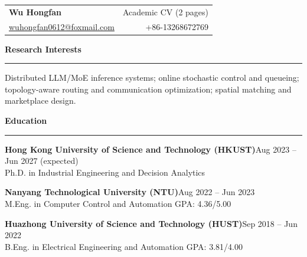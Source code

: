 \documentclass[11pt,a4paper]{article}
\newcommand{\cvsection}[1]{\vspace{2pt}\noindent\textbf{\large #1}\\[-2pt]\textcolor{cvgray}{\rule{\linewidth}{0.4pt}}\vspace{2pt}}
\newcommand{\cvname}[1]{{\huge\textbf{#1}}}
\newcommand{\cvsmall}{\fontsize{10.5pt}{13pt}\selectfont}
\newcommand{\cvitem}[2]{\textbf{#1}\hfill \textcolor{cvgray}{#2}\\}
\begin{document}
\cvsmall

\begin{tabularx}{\linewidth}{@{}X r@{}}
\cvname{Wu Hongfan} & \textcolor{cvgray}{Academic CV (2 pages)}\\[-1pt]
\href{mailto:wuhongfan0612@foxmail.com}{wuhongfan0612@foxmail.com} & +86-13268672769\\
\end{tabularx}

\vspace{6pt}

\cvsection{Research Interests}
Distributed LLM/MoE inference systems; online stochastic control and queueing; topology-aware routing and communication optimization; spatial matching and marketplace design.

\cvsection{Education}
\cvitem{Hong Kong University of Science and Technology (HKUST)}{Aug 2023 -- Jun 2027 (expected)}
Ph.D. in Industrial Engineering and Decision Analytics

\cvitem{Nanyang Technological University (NTU)}{Aug 2022 -- Jun 2023}
M.Eng. in Computer Control and Automation \hfill GPA: 4.36/5.00

\cvitem{Huazhong University of Science and Technology (HUST)}{Sep 2018 -- Jun 2022}
B.Eng. in Electrical Engineering and Automation \hfill GPA: 3.81/4.00
\end{document}
